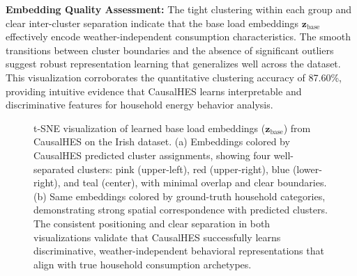 \documentclass[journal]{IEEEtran}
\begin{document}
\textbf{Embedding Quality Assessment:} The tight clustering within each group and clear inter-cluster separation indicate that the base load embeddings $\mathbf{z}_{\text{base}}$ effectively encode weather-independent consumption characteristics. The smooth transitions between cluster boundaries and the absence of significant outliers suggest robust representation learning that generalizes well across the dataset. This visualization corroborates the quantitative clustering accuracy of 87.60\%, providing intuitive evidence that CausalHES learns interpretable and discriminative features for household energy behavior analysis.

\begin{figure}[t!]
\centering
{} 
\hfill
{} 
\caption{t-SNE visualization of learned base load embeddings ($\mathbf{z}_{\text{base}}$) from CausalHES on the Irish dataset. (a) Embeddings colored by CausalHES predicted cluster assignments, showing four well-separated clusters: pink (upper-left), red (upper-right), blue (lower-right), and teal (center), with minimal overlap and clear boundaries. (b) Same embeddings colored by ground-truth household categories, demonstrating strong spatial correspondence with predicted clusters. The consistent positioning and clear separation in both visualizations validate that CausalHES successfully learns discriminative, weather-independent behavioral representations that align with true household consumption archetypes.}
\label{fig:tsne_visualization}
\end{figure}
\end{document}
